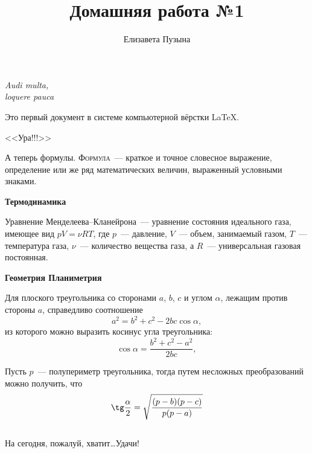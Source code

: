 \documentclass[12pt]{article}
\title{Домашняя работа №1}
\author{Елизавета Пузына}
\date{}
\begin{document}
	\maketitle
	\begin{flushright}
	\textit{Audi multa,\\ loquere pauca}
	\end{flushright}

	\vspace{20pt}Это первый документ в системе компьютерной вёрстки \LaTeX.
	
	\begin{center}
	\huge \textsf{<<Ура!!!>>}
	\end{center}
	
	А теперь формулы. \textsc{Формула}~--- краткое и точное словесное выражение, определение или же ряд математических величин, выраженный условными знаками.
	
    \vspace{15pt} \hspace{14pt} {\bfseries \Large Термодинамика}
	
	Уравнение Менделеева--Кланейрона~--- уравнение состояния идеального газа, имеющее вид $pV = \nu RT$, где $p$~--- давление, $V$~--- объем, занимаемый газом, $T$~--- температура газа, $\nu$~--- количество вещества газа, а $R$~--- универсальная газовая постоянная.
	
	{\vspace{15pt} \hspace{14pt} \bfseries \Large Геометрия \hfill Планиметрия}
	
    Для плоского треугольника со сторонами $a$, $b$, $c$ и углом $\alpha$, лежащим против стороны $a$, справедливо соотношение
	$$
	a^2 = b^2 + c^2 - 2bc \cos \alpha,
	$$
	из которого можно выразить косинус угла треугольника:
	$$
	\cos \alpha = \frac{b^2 + c^2 - a^2}{2bc},
	$$
	
	Пусть $p$~--- полупериметр треугольника, тогда путем несложных преобразований можно получить, что
	$$
	\tg \frac{\alpha}{2} = \sqrt{\frac{(p-b)(p-c)}{p(p-a)}}
	$$ \\[1cm]
	На сегодня, пожалуй, хватит\dots Удачи!
\end{document}
